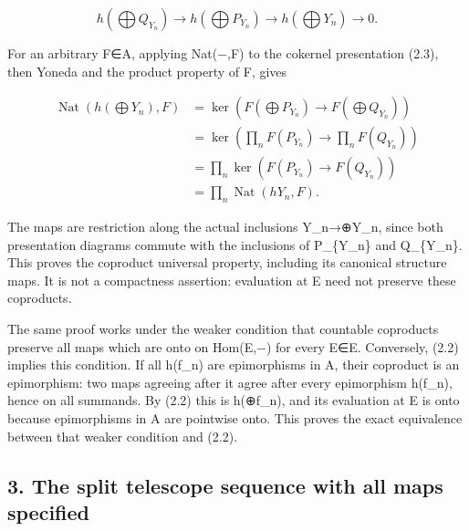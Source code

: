 \[
 h(\bigoplus Q_{Y_n})\longrightarrow
 h(\bigoplus P_{Y_n})\longrightarrow
 h(\bigoplus Y_n)\longrightarrow0. \tag{2.3}
\]

For an arbitrary F\allowbreak{}∈A,\allowbreak{} applying Nat(−,\allowbreak{}F)\allowbreak{} to the cokernel presentation (2.3)\allowbreak{},\allowbreak{} then Yoneda and the product property of F,\allowbreak{} gives

\[
\begin{aligned}
 \operatorname{Nat}(h(\bigoplus Y_n),F)
  &=\ker\left(F(\bigoplus P_{Y_n})\to F(\bigoplus Q_{Y_n})\right)\\
  &=\ker\left(\prod_n F(P_{Y_n})\to\prod_n F(Q_{Y_n})\right)\\
  &=\prod_n\ker\left(F(P_{Y_n})\to F(Q_{Y_n})\right)\\
  &=\prod_n\operatorname{Nat}(hY_n,F).
\end{aligned}
\]

The maps are restriction along the actual inclusions Y\_\allowbreak{}n\allowbreak{}→\allowbreak{}⊕Y\_\allowbreak{}n,\allowbreak{} since both presentation diagrams commute with the inclusions of P\_\allowbreak{}\{Y\_\allowbreak{}n\} and Q\_\allowbreak{}\{Y\_\allowbreak{}n\}. This proves the coproduct universal property,\allowbreak{} including its canonical structure maps. It is not a compactness assertion:\allowbreak{} evaluation at E need not preserve these coproducts.

The same proof works under the weaker condition that countable coproducts preserve all maps which are onto on Hom(E,\allowbreak{}−)\allowbreak{} for every E\allowbreak{}∈E. Conversely,\allowbreak{} (2.2)\allowbreak{} implies this condition. If all h(f\_\allowbreak{}n)\allowbreak{} are epimorphisms in A,\allowbreak{} their coproduct is an epimorphism:\allowbreak{} two maps agreeing after it agree after every epimorphism h(f\_\allowbreak{}n)\allowbreak{},\allowbreak{} hence on all summands. By (2.2)\allowbreak{} this is h(\allowbreak{}⊕f\_\allowbreak{}n)\allowbreak{},\allowbreak{} and its evaluation at E is onto because epimorphisms in A are pointwise onto. This proves the exact equivalence between that weaker condition and (2.2)\allowbreak{}.

\subsection{3. The split telescope sequence with all maps specified}\label{proofs-11460-11655-the-split-telescope-sequence-with-all-maps-specified}

